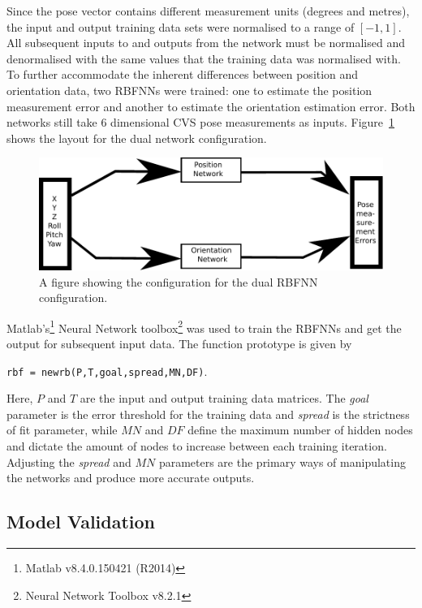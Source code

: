 Since the pose vector contains different measurement units (degrees and metres), the input and output training data sets were normalised to a range of $[-1, 1]$. All subsequent inputs to and outputs from the network must be normalised and denormalised with the same values that the training data was normalised with. To further accommodate the inherent differences between position and orientation data, two RBFNNs were trained: one to estimate the position measurement error and another to estimate the orientation estimation error. Both networks still take 6 dimensional CVS pose measurements as inputs. Figure~\ref{fig:chap4-two-networks} shows the layout for the dual network configuration.

\begin{figure}
  \centering
  \includegraphics[width=\textwidth]{figures/chapter4/two_network}
  \caption{A figure showing the configuration for the dual RBFNN configuration.}
  \label{fig:chap4-two-networks}
\end{figure}

Matlab's\footnote{Matlab v8.4.0.150421 (R2014)} Neural Network toolbox\footnote{Neural Network Toolbox v8.2.1} was used to train the RBFNNs and get the output for subsequent input data. The function prototype is given by 

\begin{center}
  \verb|rbf = newrb(P,T,goal,spread,MN,DF)|.
\end{center}

Here, $P$ and $T$ are the input and output training data matrices. The \emph{goal} parameter is the error threshold for the training data and \emph{spread} is the strictness of fit parameter, while $\mathit{MN}$ and $\mathit{DF}$ define the maximum number of hidden nodes and dictate the amount of nodes to increase between each training iteration. Adjusting the \emph{spread} and $\mathit{MN}$ parameters are the primary ways of manipulating the networks and produce more accurate outputs. 

\subsection{Model Validation}

